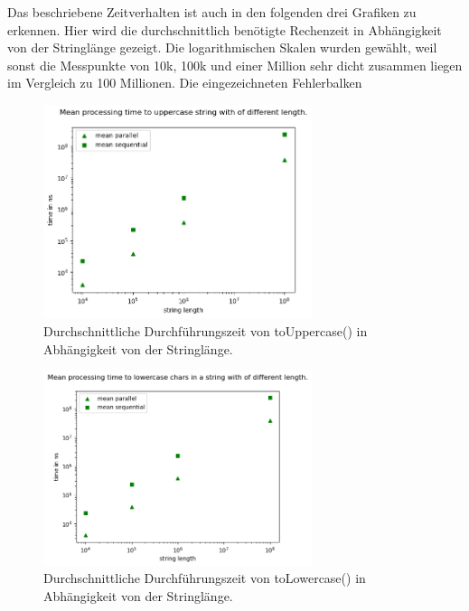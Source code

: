 \documentclass[plainarticle,zihtitle,german,final,hyperref,utf8]{zihpub}
\begin{document}
Das beschriebene Zeitverhalten ist auch in den folgenden drei Grafiken zu erkennen.
Hier wird die durchschnittlich benötigte Rechenzeit in Abhängigkeit von der Stringlänge gezeigt.
Die logarithmischen Skalen wurden gewählt, weil sonst die Messpunkte von 10k, 100k und einer Million sehr dicht zusammen liegen im Vergleich zu 100 Millionen.
Die eingezeichneten Fehlerbalken 


\begin{figure}[h]
	\begin{center}
		\includegraphics[width=0.7\textwidth]{images/complex_upper.png}
		\caption{Durchschnittliche Durchführungszeit von toUppercase() in Abhängigkeit von der Stringlänge.}
		\label{fig:mean_upper}
	\end{center}
\end{figure}

\begin{figure}[h]
	\begin{center}
		\includegraphics[width=0.7\textwidth]{images/complex_lower.png}
		\caption{Durchschnittliche Durchführungszeit von toLowercase() in Abhängigkeit von der Stringlänge.}
		\label{fig:mean_upper}
	\end{center}
\end{figure}
\end{document}
